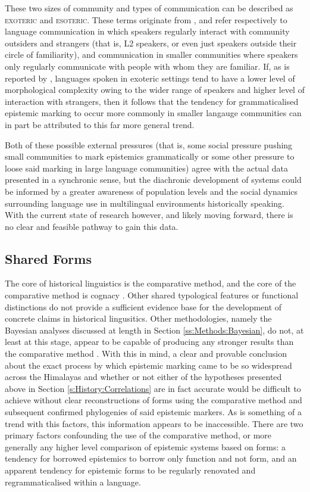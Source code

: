 These two sizes of community and types of communication can be described as \textsc{exoteric} and \textsc{esoteric}. These terms originate from , and refer respectively to language communication in which speakers regularly interact with community outsiders and strangers (that is, L2 speakers, or even just speakers outside their circle of familiarity), and communication in smaller communities where speakers only regularly communicate with people with whom they are familiar. If, as is reported by , languages spoken in exoteric settings tend to have a lower level of morphological complexity owing to the wider range of speakers and higher level of interaction with strangers, then it follows that the tendency for grammaticalised epistemic marking to occur more commonly in smaller langauge communities can in part be attributed to this far more general trend. 

Both of these possible external pressures (that is, some social pressure pushing small communities to mark epistemics grammatically or some other pressure to loose said marking in large language communities) agree with the actual data presented in a synchronic sense, but the diachronic development of systems could be informed by a greater awareness of population levels and the social dynamics surrounding language use in multilingual environments historically speaking. With the current state of research however, and likely moving forward, there is no clear and feasible pathway to gain this data.
\subsection{Shared Forms}\label{ss:History:SharedForms}
The core of historical linguistics is the comparative method, and the core of the comparative method is cognacy \cite{Hyslop2020Millet}. Other shared typological features or functional distinctions do not provide a sufficient evidence base for the development of concrete claims in historical lingusitics. Other methodologies, namely the Bayesian analyses discussed at length in Section \ref{ss:Methods:Bayesian}, do not, at least at this stage, appear to be capable of producing any stronger results than the comparative method \cite{Dolin2022}. With this in mind, a clear and provable conclusion about the exact process by which epistemic marking came to be so widespread across the Himalayas and whether or not either of the hypotheses presented above in Section \ref{s:History:Correlations} are in fact accurate would be difficult to achieve without clear reconstructions of forms using the comparative method and subsequent confirmed phylogenies of said epistemic markers. As is something of a trend with this factors, this information appears to be inaccessible. There are two primary factors confounding the use of the comparative method, or more generally any higher level comparison of epistemic systems based on forms: a tendency for borrowed epistemics to borrow only function and not form, and an apparent tendency for epistemic forms to be regularly renovated and regrammaticalised within a language. 

